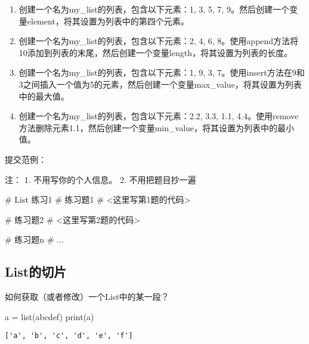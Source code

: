 \documentclass[
  letterpaper,
  DIV=11,
  numbers=noendperiod]{scrreprt}
\newenvironment{Shaded}{\begin{snugshade}}{\end{snugshade}}
\newcommand{\BuiltInTok}[1]{\textcolor[rgb]{0.00,0.23,0.31}{#1}}
\newcommand{\CommentTok}[1]{\textcolor[rgb]{0.37,0.37,0.37}{#1}}
\newcommand{\NormalTok}[1]{\textcolor[rgb]{0.00,0.23,0.31}{#1}}
\newcommand{\OperatorTok}[1]{\textcolor[rgb]{0.37,0.37,0.37}{#1}}
\newcommand{\StringTok}[1]{\textcolor[rgb]{0.13,0.47,0.30}{#1}}
\begin{document}
\begin{enumerate}
\def\labelenumi{\arabic{enumi}.}
\item
  创建一个名为my\_list的列表，包含以下元素：1, 3, 5, 7,
  9。然后创建一个变量element，将其设置为列表中的第四个元素。
\item
  创建一个名为my\_list的列表，包含以下元素：2, 4, 6,
  8。使用append方法将10添加到列表的末尾，然后创建一个变量length，将其设置为列表的长度。
\item
  创建一个名为my\_list的列表，包含以下元素：1, 9, 3,
  7。使用insert方法在9和3之间插入一个值为5的元素，然后创建一个变量max\_value，将其设置为列表中的最大值。
\item
  创建一个名为my\_list的列表，包含以下元素：2.2, 3.3, 1.1,
  4.4。使用remove方法删除元素1.1，然后创建一个变量min\_value，将其设置为列表中的最小值。
\end{enumerate}

提交范例：

注： 1. 不用写你的个人信息。 2. 不用把题目抄一遍

\begin{Shaded}
\begin{Highlighting}[]
\CommentTok{\# List 练习1}
\CommentTok{\# 练习题1}
\CommentTok{\# \textless{}这里写第1题的代码\textgreater{} }

\CommentTok{\# 练习题2}
\CommentTok{\# \textless{}这里写第2题的代码\textgreater{} }

\CommentTok{\# 练习题n}
\CommentTok{\# ...}
\end{Highlighting}
\end{Shaded}

\hypertarget{listux7684ux5207ux7247}{%
\subsection{List的切片}\label{listux7684ux5207ux7247}}

如何获取（或者修改）一个List中的某一段？

\begin{Shaded}
\begin{Highlighting}[]
\NormalTok{a }\OperatorTok{=} \BuiltInTok{list}\NormalTok{(}\StringTok{\textquotesingle{}abcdef\textquotesingle{}}\NormalTok{)}
\BuiltInTok{print}\NormalTok{(a)}
\end{Highlighting}
\end{Shaded}

\begin{verbatim}
['a', 'b', 'c', 'd', 'e', 'f']
\end{verbatim}
\end{document}
